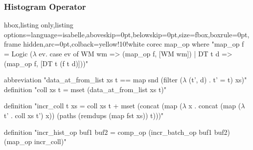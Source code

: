 \documentclass[aspectratio=169,10pt]{beamer}
\begin{document}
\begin{frame}[fragile]
  \frametitle{Histogram Operator}
\vspace*{-1ex}
\begin{tcblisting}{hbox,listing only,listing options={language=isabelle,aboveskip=0pt,belowskip=0pt},size=fbox,boxrule=0pt,frame hidden,arc=0pt,colback=yellow!10!white}
corec map_op where "map_op f = Logic ($\lambda$ ev. case ev of
       WM wm => (map_op f, [WM wm]) | DT t d => (map_op f, [DT t (f t d)]))"

abbreviation "data_at_from_list xs t == map snd (filter ($\lambda$ (t', d) . t' = t) xs)"
definition "coll xs t = mset (data_at_from_list xs t)"

definition "incr_coll t xs = coll xs t + mset (concat (map
  ($\lambda$ x . concat (map ($\lambda$ t' . coll xs t') x)) (paths (remdups (map fst xs)) t)))"

definition "incr_hist_op buf1 buf2 =
  comp_op (incr_batch_op buf1 buf2) (map_op incr_coll)"
\end{tcblisting}
\vspace*{-1ex}

\end{frame}
\end{document}
